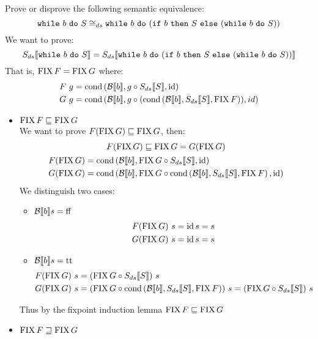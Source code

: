 \begin{exercise}{
    Prove or disprove the following semantic equivalence:
    \[ \wwhile{b}{S} \cong_{ds} \wwhile{b}{(\wif{b}{S}{(\wwhile{b}{S})})} \]
}
    We want to prove:
    \[ \Sds{\wwhile{b}{S}} = \Sds{\wwhile{b}{(\wif{b}{S}{(\wwhile{b}{S})})}} \]
    That is, $\FIX F = \FIX G$ where:
    \begin{align*}
        F\ g &= \cond{\Bool{b}}{g \circ \Sds{S}}{\id} \\
        G\ g &= \cond{\Bool{b}}{g \circ (\cond{\Bool{b}}{\Sds{S}}{\FIX F})}{id}
    \end{align*}
    \begin{itemize}
        \item $\FIX F \sqsubseteq \FIX G$ \\
            We want to prove $F (\FIX G) \sqsubseteq \FIX G$, then:
            \begin{gather*}
                F (\FIX G) \sqsubseteq \FIX G = G(\FIX G) \\
                \begin{align*}
                    F (\FIX G) &= \cond{\Bool{b}}{\FIX G \circ \Sds{S}}{\id} \\
                    G (\FIX G) &= \cond{\Bool{b}}{\FIX G \circ \cond{\Bool{b}}{\Sds{S}}{\FIX F}}{\id}
                \end{align*}
            \end{gather*}
            We distinguish two cases:
            \begin{itemize}
                \item $\Bool{b} s = \text{ff}$
                    \begin{align*}
                        F (\FIX G)\ s = \id s = s \\
                        G (\FIX G)\ s = \id s = s
                    \end{align*}
                \item $\Bool{b} s = \text{tt}$
                    \begin{align*}
                        F (\FIX G)\ s &= (\FIX G \circ \Sds{S})\ s \\
                        G (\FIX G)\ s &= (\FIX G \circ \cond{\Bool{b}}{\Sds{S}}{\FIX F})\ s = (\FIX G \circ \Sds{S})\ s
                    \end{align*}
            \end{itemize}
            Thus by the fixpoint induction lemma $\FIX F \sqsubseteq \FIX G$
        \item $\FIX F \sqsupseteq \FIX G$ \\

\end{itemize}
\end{exercise}
